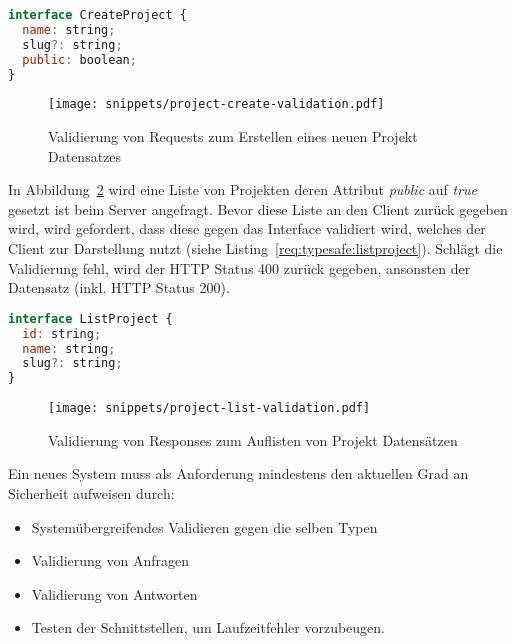 \begin{lstlisting}[language=Javascript,float=h!,caption={Interface zum Erstellen eines Projektes}, label={req:typesafe:createproject}]
interface CreateProject {
  name: string;
  slug?: string;
  public: boolean;
}
\end{lstlisting}

\begin{figure}[h!]
	\centering
	\texttt{[image: snippets/project-create-validation.pdf]}
	\caption{Validierung von Requests zum Erstellen eines neuen Projekt Datensatzes}
	\label{req:typesafe:request-validation}
\end{figure}

In Abbildung~\ref{req:typesafe:list-validation} wird eine Liste von Projekten deren Attribut \emph{public} auf \emph{true} gesetzt ist beim Server angefragt. Bevor diese Liste an den Client zurück gegeben wird, wird gefordert, dass diese gegen das Interface validiert wird, welches der Client zur Darstellung nutzt (siehe Listing~\ref{req:typesafe:listproject}). Schlägt die Validierung fehl, wird der HTTP Status 400 zurück gegeben, ansonsten der Datensatz (inkl. HTTP Status 200).

\begin{lstlisting}[language=Javascript,float=h!,caption={Interface zum Auflisten von Projekten}, label={req:typesafe:listproject}]
interface ListProject {
  id: string;
  name: string;
  slug?: string;
}
\end{lstlisting}

\begin{figure}[h!]
    \centering
    \texttt{[image: snippets/project-list-validation.pdf]}
    \caption{Validierung von Responses zum Auflisten von Projekt Datensätzen}
    \label{req:typesafe:list-validation}
\end{figure}

Ein neues System muss als Anforderung mindestens den aktuellen Grad an Sicherheit aufweisen durch:

\begin{itemize}
    \setlength\itemsep{-1em}
    \item Systemübergreifendes Validieren gegen die selben Typen
    \item Validierung von Anfragen
    \item Validierung von Antworten
    \item Testen der Schnittstellen, um Laufzeitfehler vorzubeugen.
\end{itemize}

